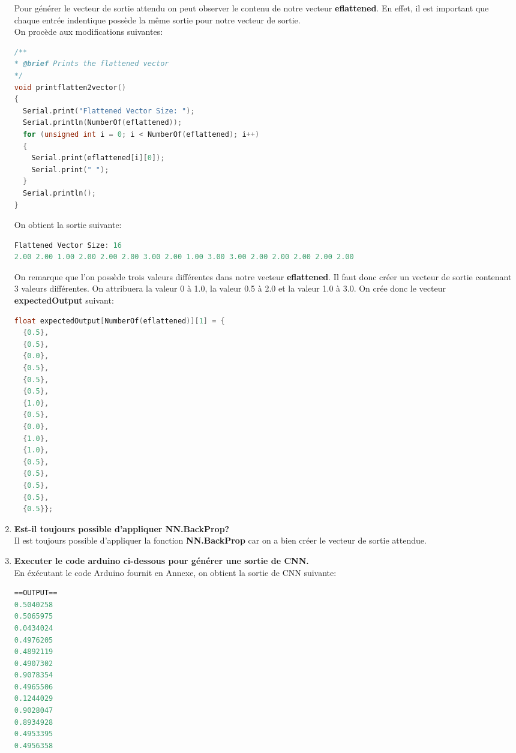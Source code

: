 \begin{enumerate}
{    Pour générer le vecteur de sortie attendu on peut observer le contenu de notre vecteur \textbf{eflattened}. 
    En effet, il est important que chaque entrée indentique possède la même sortie pour notre vecteur de sortie. \\
    On procède aux modifications suivantes:
    \begin{lstlisting}[language=C]
/**
* @brief Prints the flattened vector
*/
void printflatten2vector()
{
  Serial.print("Flattened Vector Size: ");
  Serial.println(NumberOf(eflattened));
  for (unsigned int i = 0; i < NumberOf(eflattened); i++)
  {
    Serial.print(eflattened[i][0]);
    Serial.print(" ");
  }
  Serial.println();
}    
    \end{lstlisting}
    On obtient la sortie suivante:
    \begin{lstlisting}[language=C]
Flattened Vector Size: 16
2.00 2.00 1.00 2.00 2.00 2.00 3.00 2.00 1.00 3.00 3.00 2.00 2.00 2.00 2.00 2.00
    \end{lstlisting}
    On remarque que l'on possède trois valeurs différentes dans notre vecteur \textbf{eflattened}.
    Il faut donc créer un vecteur de sortie contenant 3 valeurs différentes. On attribuera la valeur 0 à 1.0, la valeur 0.5 à 2.0 et la valeur 1.0 à 3.0.
    On crée donc le vecteur \textbf{expectedOutput} suivant:
    \begin{lstlisting}[language=C]
float expectedOutput[NumberOf(eflattened)][1] = {
  {0.5},
  {0.5},
  {0.0},
  {0.5},
  {0.5},
  {0.5},
  {1.0},
  {0.5},
  {0.0},
  {1.0},
  {1.0},
  {0.5},
  {0.5},
  {0.5},
  {0.5},
  {0.5}};
    \end{lstlisting}
  } 
  \item {
    \textbf{Est-il toujours possible d'appliquer NN.BackProp?} \vspace{0.2cm} \\
    Il est toujours possible d'appliquer la fonction \textbf{NN.BackProp} car on a bien créer le vecteur de sortie attendue.
  } \\
  \item {
    \textbf{Executer le code arduino ci-dessous pour générer une sortie de CNN.} \vspace{0.2cm} \\ 
    En éxécutant le code Arduino fournit en Annexe, on obtient la sortie de CNN suivante:
    \begin{lstlisting}[language=C]
==OUTPUT==
0.5040258
0.5065975
0.0434024
0.4976205
0.4892119
0.4907302
0.9078354
0.4965506
0.1244029
0.9028047
0.8934928
0.4953395
0.4956358

\end{lstlisting}}
\end{enumerate}
